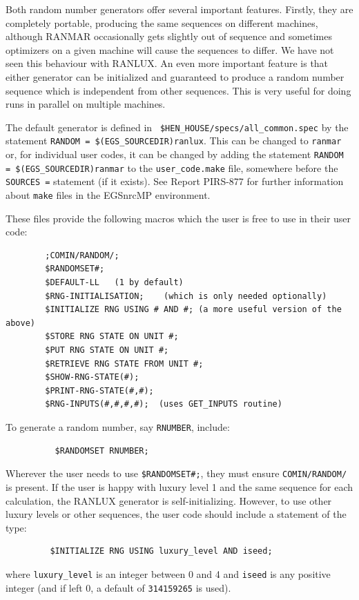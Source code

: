 Both random number generators offer several important features. Firstly,
they are completely portable, producing the same sequences on different
machines, although RANMAR occasionally gets slightly out of sequence and
sometimes optimizers on a given machine will cause the sequences to differ.
We have not seen this behaviour with RANLUX.  An even more important
feature is that either generator can be initialized and guaranteed to
produce a random number sequence which is independent from other sequences.
This is very useful for doing runs in parallel on multiple machines.


The default generator is defined in {\tt
\$HEN\_HOUSE/specs/all\_common.spec} by the statement {\tt RANDOM =
\$(EGS\_SOURCEDIR)ranlux}. This can be changed to {\tt ranmar} or,
for individual user codes, it can be changed by adding the statement
{\tt RANDOM = \$(EGS\_SOURCEDIR)ranmar} to the {\tt user\_code.make}
file, somewhere before the {\tt SOURCES =} statement (if it exists).
See Report PIRS-877 for further information about {\tt make} files in
the EGSnrcMP environment\cite{Ka03}.

These files provide the following macros which the user is free to use in
their user code:
\begin{verbatim}
        ;COMIN/RANDOM/;
        $RANDOMSET#;
        $DEFAULT-LL   (1 by default)
        $RNG-INITIALISATION;    (which is only needed optionally)
        $INITIALIZE RNG USING # AND #; (a more useful version of the above)
        $STORE RNG STATE ON UNIT #;
        $PUT RNG STATE ON UNIT #;
        $RETRIEVE RNG STATE FROM UNIT #;
        $SHOW-RNG-STATE(#);
        $PRINT-RNG-STATE(#,#);
        $RNG-INPUTS(#,#,#,#);  (uses GET_INPUTS routine)
\end{verbatim}
To generate a random number, say {\tt RNUMBER}, include:
\begin{verbatim}
          $RANDOMSET RNUMBER;
\end{verbatim}
Wherever the user needs to use {\tt \$RANDOMSET\#;}, they must ensure
{\tt COMIN/RANDOM/} is present.
If the user is happy with luxury level 1 and the same sequence for each
calculation, the RANLUX generator is self-initializing. However, to use
other luxury levels or other sequences, the user code should include
a statement of the type:
\begin{verbatim}
         $INITIALIZE RNG USING luxury_level AND iseed;
\end{verbatim}
where {\tt luxury\_level} is an integer between 0 and 4 and {\tt iseed}
is any positive integer (and if left 0, a default of {\tt 314159265} is used).

